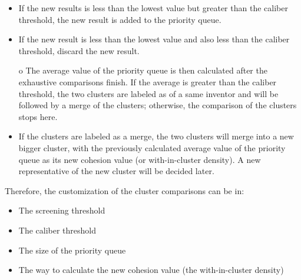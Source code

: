 \documentclass{article}
\begin{document}
\begin{itemize}
\item If the new results is less than the lowest value but greater than the
caliber threshold, the new result is added to the priority queue.

\item If the new result is less than the lowest value and also less than the
caliber threshold, discard the new result.

o The average value of the priority queue is then calculated after the exhaustive
comparisons finish. If the average is greater than the caliber threshold, the two
clusters are labeled as of a same inventor and will be followed by a merge of the
clusters; otherwise, the comparison of the clusters stops here.

\item If the clusters are labeled as a merge, the two clusters 
will merge into a new bigger cluster, with the previously calculated 
average value of the priority queue as its new cohesion value
(or with-in-cluster density). A new representative of the new 
cluster will be decided later.

\end{itemize}



Therefore, the customization of the cluster comparisons can be in:

\begin{itemize}

\item The screening threshold

\item The caliber threshold

\item The size of the priority queue

\item The way to calculate the new cohesion value (the with-in-cluster density)

\end{itemize}
\end{document}
